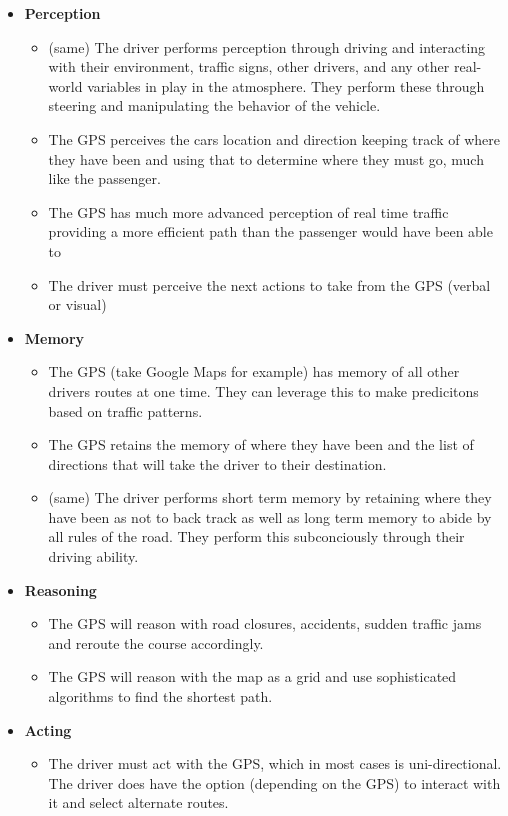 \begin{itemize}
\item
  \textbf{Perception}
  \begin{itemize}
  \item
    (same) The driver performs perception through driving and interacting with their environment, traffic signs, other drivers, and any other real-world variables in play in the atmosphere. They perform these through steering and manipulating the behavior of the vehicle.
  \item
    The GPS perceives the cars location and direction keeping track of where they have been and using that to determine where they must go, much like the passenger.
  \item
    The GPS has much more advanced perception of real time traffic providing a more efficient path than the passenger would have been able to
  \item
    The driver must perceive the next actions to take from the GPS (verbal or visual)
  \end{itemize}
\item
  \textbf{Memory}
  \begin{itemize}
  \item
    The GPS (take Google Maps for example) has memory of all other drivers routes at one time. They can leverage this to make predicitons based on  traffic patterns.
  \item
    The GPS retains the memory of where they have been and the list of directions that will take the driver to their destination.
  \item
    (same) The driver performs short term memory by retaining where they have been as not to back track as well as long term memory to abide by all rules of the road. They perform this subconciously through their driving ability.
  \end{itemize}
\item
  \textbf{Reasoning}
  \begin{itemize}
  \item
    The GPS will reason with road closures, accidents, sudden traffic jams and reroute the course accordingly.
  \item
    The GPS will reason with the map as a grid and use sophisticated algorithms to find the shortest path.
  \end{itemize}
\item
  \textbf{Acting}
  \begin{itemize}
  \item
    The driver must act with the GPS, which in most cases is uni-directional. The driver does have the option (depending on the GPS) to interact with it and select alternate routes.
  \end{itemize}
\end{itemize}

